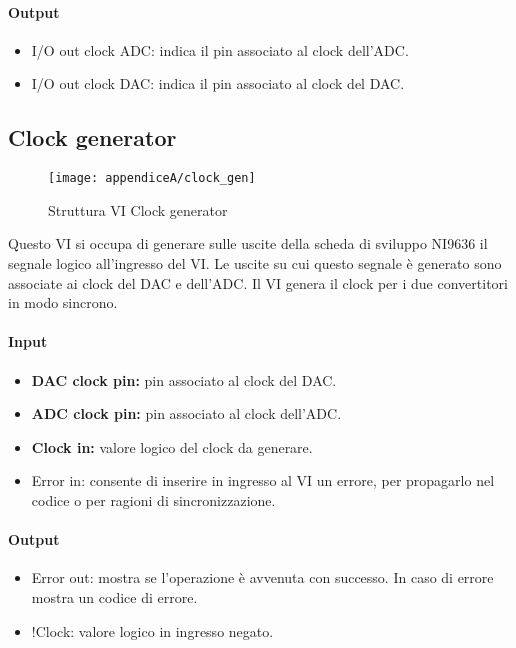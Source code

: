 \paragraph*{Output}
\begin{itemize}
	\item I/O out clock ADC: indica il pin associato al clock dell'ADC.
	\item I/O out clock DAC: indica il pin associato al clock del DAC.
\end{itemize}

\subsection*{Clock generator}

\begin{figure}[H]
	\begin{center}
		\texttt{[image: appendiceA/clock\_gen]}
		\caption{Struttura VI Clock generator}
	\end{center}
\end{figure}

Questo VI si occupa di generare sulle uscite della scheda di sviluppo NI9636 il segnale logico all'ingresso del VI. Le uscite su cui questo segnale è generato sono associate ai clock del DAC e dell'ADC. Il VI genera il clock per i due convertitori in modo sincrono.

\paragraph*{Input}
\begin{itemize}
	\item \textbf{DAC clock pin:} pin associato al clock del DAC.
	\item \textbf{ADC clock pin:} pin associato al clock dell'ADC.
	\item \textbf{Clock in:} valore logico del clock da generare.
	\item Error in: consente di inserire in ingresso al VI un errore, per propagarlo nel codice o per ragioni di sincronizzazione.
\end{itemize}

\paragraph*{Output}
\begin{itemize}
	\item Error out: mostra se l'operazione è avvenuta con successo. In caso di errore mostra un codice di errore.
	\item !Clock: valore logico in ingresso negato.
\end{itemize}

